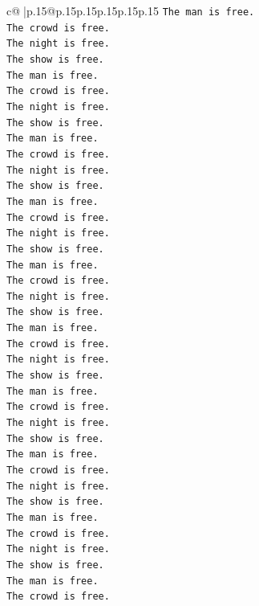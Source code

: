 \documentclass{article}
\begin{document}
{\begin{supertabular}{c@{$\;$}|p{.15\linewidth}@{}p{.15\linewidth}p{.15\linewidth}p{.15\linewidth}p{.15\linewidth}p{.15\linewidth}}
{{{\texttt{The man is free.} \\
\texttt{The crowd is free.} \\
\texttt{The night is free.} \\
\texttt{The show is free.} \\
\texttt{The man is free.} \\
\texttt{The crowd is free.} \\
\texttt{The night is free.} \\
\texttt{The show is free.} \\
\texttt{The man is free.} \\
\texttt{The crowd is free.} \\
\texttt{The night is free.} \\
\texttt{The show is free.} \\
\texttt{The man is free.} \\
\texttt{The crowd is free.} \\
\texttt{The night is free.} \\
\texttt{The show is free.} \\
\texttt{The man is free.} \\
\texttt{The crowd is free.} \\
\texttt{The night is free.} \\
\texttt{The show is free.} \\
\texttt{The man is free.} \\
\texttt{The crowd is free.} \\
\texttt{The night is free.} \\
\texttt{The show is free.} \\
\texttt{The man is free.} \\
\texttt{The crowd is free.} \\
\texttt{The night is free.} \\
\texttt{The show is free.} \\
\texttt{The man is free.} \\
\texttt{The crowd is free.} \\
\texttt{The night is free.} \\
\texttt{The show is free.} \\
\texttt{The man is free.} \\
\texttt{The crowd is free.} \\
\texttt{The night is free.} \\
\texttt{The show is free.} \\
\texttt{The man is free.} \\
\texttt{The crowd is free.} \\
}}}
\end{supertabular}}
\end{document}
